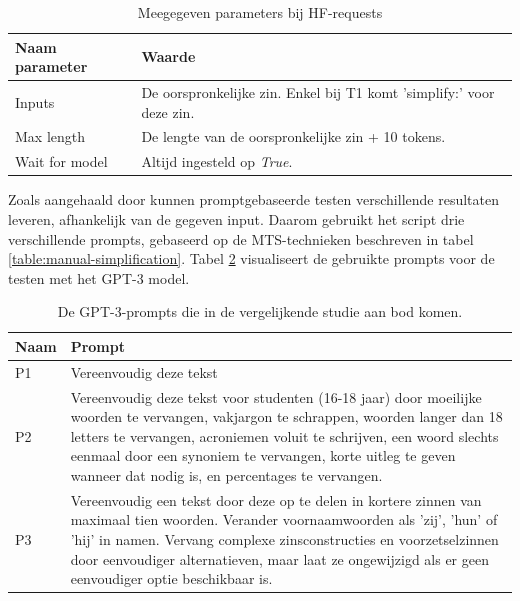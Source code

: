 \begin{center}
	\begin{table}[H]
		\begin{tabular}{ | m{6cm} | m{8cm} | } 
			\hline
			\textbf{Naam parameter} & \textbf{Waarde} \\
			\hline
			Inputs & De oorspronkelijke zin. Enkel bij T1 komt 'simplify:' voor deze zin. \\
			\hline
			Max length & De lengte van de oorspronkelijke zin + 10 tokens. \\
			\hline
			Wait for model & Altijd ingesteld op \textit{True}. \\
			\hline
		\end{tabular}
		\caption{Meegegeven parameters bij HF-requests}
		\label{table:huggingface-requests-parameters}
	\end{table}
\end{center}

Zoals aangehaald door \textcite{Gooding2022} kunnen promptgebaseerde testen verschillende resultaten leveren, afhankelijk van de gegeven input. Daarom gebruikt het script drie verschillende prompts, gebaseerd op de MTS-technieken beschreven in tabel \ref{table:manual-simplification}. Tabel \ref{table:tested-prompts} visualiseert de gebruikte prompts voor de testen met het GPT-3 model. 

\begin{center}
	\begin{table}[H]
		\begin{tabular}{ | m{2cm} | m{13cm} | } 
			\hline
			\textbf{Naam} & \textbf{Prompt} \\
			\hline
			P1 & Vereenvoudig deze tekst \\
			\hline
			P2 & Vereenvoudig deze tekst voor studenten (16-18 jaar) door moeilijke woorden te vervangen, vakjargon te schrappen, woorden langer dan 18 letters te vervangen, acroniemen voluit te schrijven, een woord slechts eenmaal door een synoniem te vervangen, korte uitleg te geven wanneer dat nodig is, en percentages te vervangen. \\
			\hline
			P3 & Vereenvoudig een tekst door deze op te delen in kortere zinnen van maximaal tien woorden. Verander voornaamwoorden als 'zij', 'hun' of 'hij' in namen. Vervang complexe zinsconstructies en voorzetselzinnen door eenvoudiger alternatieven, maar laat ze ongewijzigd als er geen eenvoudiger optie beschikbaar is. \\
			\hline
		\end{tabular}
		\caption{De GPT-3-prompts die in de vergelijkende studie aan bod komen.}
		\label{table:tested-prompts}
	\end{table}
\end{center}

